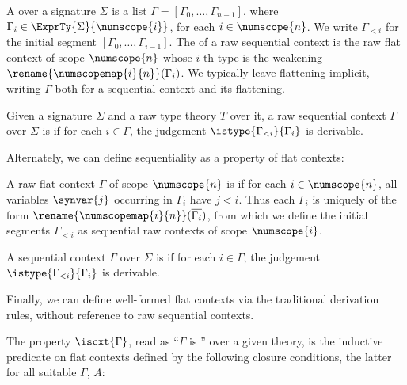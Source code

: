 \begin{definition}
  \label{def:seq-cxt-as-wellpresentedness}
  A  over a signature $\Sigma$ is a list $\Gamma
  = [\Gamma_0,\ldots,\Gamma_{n-1}]$, where $\Gamma_i \in \ExprTy{\Sigma}{\numscope{i}}$, for each $i \in \numscope{n}$.
  We write $\Gamma_{<i}$ for the initial segment $[\Gamma_0, \ldots, \Gamma_{i-1}]$.
  The  of a raw sequential context is the raw flat context of scope $\numscope{n}$ whose $i$-th type is the weakening $\rename{{\numscopemap{i}{n}}}(\Gamma_i)$.
  We typically leave flattening implicit, writing $\Gamma$ both for a sequential context and its flattening.
  
  Given a signature $\Sigma$ and a raw type theory $T$ over it,
  a raw sequential context $\Gamma$ over $\Sigma$ is  if for each $i \in \Gamma$, the judgement $\istype{\Gamma_{<i}}{\Gamma_i}$ is derivable.
\end{definition}

Alternately, we can define sequentiality as a property of flat contexts:

\begin{definition}
  \label{def:seq-cxt-by-variable-occurrence}%
  A raw flat context $\Gamma$ of scope $\numscope{n}$ is  if for each $i \in \numscope{n}$, all variables $\synvar{j}$ occurring in $\Gamma_i$ have $j < i$.
  Thus each $\Gamma_i$ is uniquely of the form $\rename{{\numscopemap{i}{n}}}(\overline{\Gamma_i})$,
  from which we define the initial segments $\Gamma_{<i}$ as sequential raw contexts of scope $\numscope{i}$.

  A sequential context $\Gamma$ over $\Sigma$ is  if for each $i \in \Gamma$, the judgement $\istype{\Gamma_{<i}}{\Gamma_i}$ is derivable.
\end{definition}

Finally, we can define well-formed flat contexts via the traditional derivation rules,
without reference to raw sequential contexts.

\begin{definition}
  \label{def:seq-cxt-by-rules}%
  The property $\iscxt{\Gamma}$, read as “$\Gamma$ is ” over a given theory, is the inductive predicate on flat contexts defined by the following closure conditions, the latter for all suitable $\Gamma$, $A$:
\end{definition}

